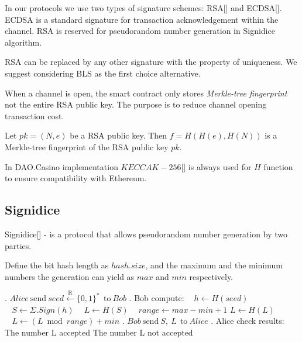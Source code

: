 In our protocols we use two types of signature schemes: RSA[] and ECDSA[]. ECDSA is a standard signature for transaction acknowledgement within the channel. RSA is reserved for pseudorandom number generation in Signidice algorithm.

\begin{remark}
RSA can be replaced by any other signature with the property of uniqueness. We suggest considering BLS \cite{bib10} as the first choice alternative.
\end{remark}

When a channel is open, the smart contract only stores \textit {Merkle-tree fingerprint} not the entire RSA public key. The purpose is to reduce channel opening transaction cost.

\begin{defn}
Let $pk = (N, e)$ be a RSA public key. Then $f = H(H(e), H(N))$ is a Merkle-tree fingerprint of the RSA public key $pk$. 
\end{defn}
\begin{remark}
In DAO.Casino implementation $KECCAK-256$[] is always used for $H$ function to ensure compatibility with Ethereum. 
\end{remark}

	\subsection{Signidice}

Signidice[] - is a protocol that allows pseudorandom number generation by two parties. 

Define the bit hash length as $hash.size$, and the maximum and the minimum numbers the generation can yield as $max$ and $ min$ respectively.

\begin{algorithm} 
\caption*{$\textbf{Signidice}$} \label{alg:signidice}
\begin{algorithmic}
. $ Alice \ \text{send}\  seed\xleftarrow{\text{R}} \{0,1\}^* \  \ \text{to} \ Bob$
. Bob compute:
\State $\ \ \ \ h \gets H(seed)$
\State $\ \ \ \ S \gets  \Sigma . Sign(h)$
\State $\ \ \ \ L \gets H(S) $
\State $\ \ \ \ range \gets max - min +1$
\State$ L \gets H(L)$
\EndWhile
\State $ \ \ \ \  L \gets (L \bmod range) + min $
. $Bob \ \text{send}\  S, \ L \ \   \text{to} \ Alice$
. Alice check results:
\State The number L accepted
\Else 
\State The number L not accepted
\EndIf
\end{algorithmic}
\end{algorithm}

